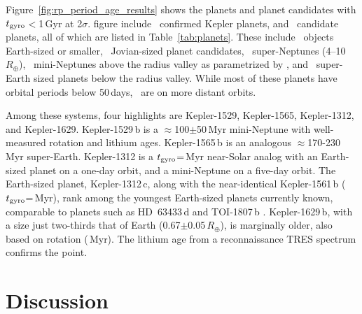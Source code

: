 \documentclass[11pt,twocolumn,tighten]{aastex63}
\begin{document}
Figure~\ref{fig:rp_period_age_results} shows the planets and planet
candidates with $t_{\rm gyro}$$<$1\,Gyr at 2$\sigma$.   figure
include \nconfirmedplyounggyrotwosigmanograzingnoruwe\ confirmed
Kepler planets, and \ncandidateplyounggyrotwosigmanograzingnoruwe\
candidate planets, all of which are listed in Table~\ref{tab:planets}.
These include \nearthshighq\ objects Earth-sized or smaller,
\njupitershighq\ Jovian-sized planet candidates, \nsubsaturnshighq\
super-Neptunes (4--10\,$R_\oplus$), \nminineptuneshighq\ mini-Neptunes
above the radius valley as parametrized by
\citealt{2018MNRAS.479.4786V}, and \nsuperearthshighq\ super-Earth
sized planets below the radius valley.  While most of these planets
have orbital periods below 50\,days, \nlongperiodhighq\ are on more
distant orbits.

Among these systems, four highlights are Kepler-1529, Kepler-1565,
Kepler-1312, and Kepler-1629.  Kepler-1529\,b is a
$\approx$100$\pm$50\,Myr mini-Neptune with well-measured rotation and
lithium ages.  Kepler-1565\,b is an analogous $\approx$170-230\,Myr
super-Earth.  Kepler-1312 is a $t_{\rm gyro}$=\kepthirteentwelve\,Myr
near-Solar analog with an Earth-sized planet on a one-day orbit, and a
mini-Neptune on a five-day orbit.  The Earth-sized planet,
Kepler-1312\,c, along with the near-identical Kepler-1561\,b ($t_{\rm
gyro}$=\kepfifteensixone\,Myr), rank among the youngest Earth-sized
planets currently known, comparable to planets such as HD~63433\,d
\citep[1.1\,$R_\oplus$, $414$$\pm$$23$\,Myr;][]{2024AJ....167...54C}
and TOI-1807\,b \citep[1.3\,$R_\oplus$,
180$\pm$40\,Myr;][]{2021AJ....162...54H}.  Kepler-1629\,b, with a size
just two-thirds that of Earth (0.67$\pm$0.05\,$R_\oplus$), is
marginally older, also based on rotation (\kepsixteentwonine\,Myr).
The lithium age from a reconnaissance TRES spectrum confirms the
point.


\section{Discussion}
\label{sec:disc}
\end{document}
